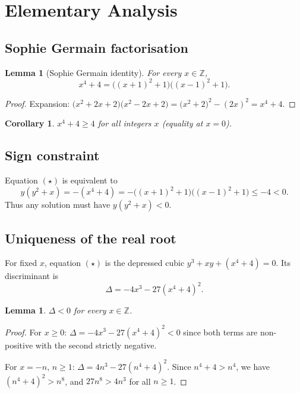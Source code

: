 \documentclass[12pt, a4paper]{article}
\newtheorem{lemma}[theorem]{Lemma}
\newtheorem{corollary}[theorem]{Corollary}
\theoremstyle{definition}
\newcommand{\Z}{\mathbb{Z}}
\begin{document}
\section{Elementary Analysis}

\subsection{Sophie Germain factorisation}

\begin{lemma}[Sophie Germain identity]\label{lem:sg}
  For every $x\in\Z$,
  \[
    x^4 + 4 = \bigl((x+1)^2+1\bigr)\bigl((x-1)^2+1\bigr).
  \]
\end{lemma}
\begin{proof}
  Expansion: $\bigl(x^2+2x+2\bigr)\bigl(x^2-2x+2\bigr)
  = \bigl(x^2+2\bigr)^2 - (2x)^2 = x^4+4$.
\end{proof}

\begin{corollary}
  $x^4 + 4 \geq 4$ for all integers $x$ (equality at $x=0$).
\end{corollary}

\subsection{Sign constraint}

Equation $(\star)$ is equivalent to
\[
  y(y^2 + x) = -(x^4+4) = -\bigl((x+1)^2+1\bigr)\bigl((x-1)^2+1\bigr) \leq -4 < 0.
\]
Thus any solution must have $y(y^2+x)<0$.

\subsection{Uniqueness of the real root}

For fixed $x$, equation $(\star)$ is the depressed cubic $y^3 + xy + (x^4+4) = 0$.
Its discriminant is
\[
  \Delta = -4x^3 - 27(x^4+4)^2.
\]

\begin{lemma}\label{lem:disc}
  $\Delta < 0$ for every $x\in\Z$.
\end{lemma}
\begin{proof}
  For $x\geq 0$: $\Delta = -4x^3 - 27(x^4+4)^2 < 0$ since both terms are non-positive with the second strictly negative.

  For $x = -n$, $n\geq 1$: $\Delta = 4n^3 - 27(n^4+4)^2$.  Since $n^4+4 > n^4$,
  we have $(n^4+4)^2 > n^8$, and $27n^8 > 4n^3$ for all $n\geq 1$.
\end{proof}
\end{document}
